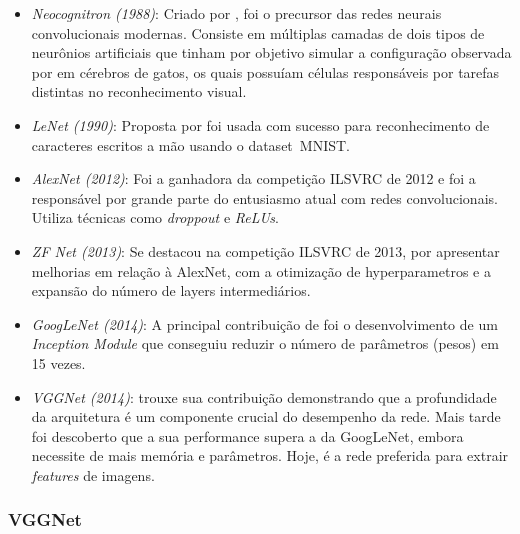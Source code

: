 \begin{itemize}

  \item \emph{Neocognitron (1988)}: Criado por
    \citet{fukushima1988neocognitron}, foi o precursor das redes neurais
    convolucionais modernas. Consiste em múltiplas camadas de dois tipos de
    neurônios artificiais que tinham por objetivo simular a configuração
    observada por \citet{hubel1959receptive} em cérebros de gatos, os quais
    possuíam células responsáveis por tarefas distintas no reconhecimento
    visual.

  \item \emph{LeNet (1990)}: Proposta por \citet{le1990handwritten} foi usada
    com sucesso para reconhecimento de caracteres escritos a mão usando o
    dataset~MNIST.\@

  \item \emph{AlexNet (2012)}: \citet{krizhevsky2012imagenet} Foi a ganhadora
    da competição ILSVRC de 2012 e foi a responsável por grande parte do
    entusiasmo atual com redes convolucionais. Utiliza técnicas como
    \emph{droppout} e \emph{ReLUs}.

  \item \emph{ZF Net (2013)}: Se destacou na competição ILSVRC de 2013, por
    apresentar melhorias em relação à AlexNet, com a otimização de
    hyperparametros e a expansão do número de layers intermediários.
    \citet{zeiler2014visualizing}

  \item \emph{GoogLeNet (2014)}: A principal contribuição de
    \citet{szegedy2014going} foi o desenvolvimento de um \emph{Inception
      Module} que conseguiu reduzir o número de parâmetros (pesos) em 15 vezes.

  \item \emph{VGGNet (2014)}: \citet{zeiler2014visualizing} trouxe sua
    contribuição demonstrando que a profundidade da arquitetura é um componente
    crucial do desempenho da rede. Mais tarde foi descoberto que a sua
    performance supera a da GoogLeNet, embora necessite de mais memória e
    parâmetros. Hoje, é a rede preferida para extrair \emph{features} de
    imagens.

\end{itemize}

\subsubsection{VGGNet}

